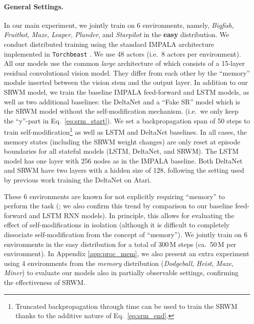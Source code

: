 \documentclass[nohyperref]{article}
\theoremstyle{plain}
\theoremstyle{definition}
\theoremstyle{remark}
\begin{document}
\paragraph{General Settings.}
In our main experiment, we jointly train on 6 environments, namely, \textit{Bigfish}, \textit{Fruitbot}, \textit{Maze}, \textit{Leaper}, \textit{Plunder}, and \textit{Starpilot}
in the \textbf{easy} distribution.
We conduct distributed training using the standard IMPALA \citep{EspeholtSMSMWDF18} architecture implemented in \texttt{Torchbeast} \citep{kuttler2019torchbeast}.
We use 48 actors (i.e.~8 actors per environment).
All our models use the common \textit{large} architecture of \citet{EspeholtSMSMWDF18} which consists of a 15-layer residual convolutional vision model.
They differ from each other by 
the ``memory'' module inserted between the vision stem and the output layer.
In addition to our SRWM model, we train the baseline IMPALA feed-forward and LSTM \citep{gers2000learning, hochreiter1997long} models,
as well as two additional baselines: the DeltaNet \citep{schlag2021linear} and a ``Fake SR'' model which is the SRWM model
without the self-modification mechanism.
(i.e.~we only keep the ``y''-part in Eq.~\ref{eq:srm_start}).
We set a backpropagation span of 50 steps to train self-modification\footnote{Truncated backpropagation through time \citep{williams1990efficient} can be used to train the SRWM thanks to the additive nature of Eq.~\ref{eq:srm_end}.} as well as LSTM and DeltaNet baselines.
In all cases, the memory states (including the SRWM weight changes) are only reset at episode boundaries for all stateful models (LSTM, DeltaNet, and SRWM).
The LSTM model has one layer with 256 nodes as in the IMPALA baseline.
Both DeltaNet and SRWM have two layers with a hidden size of 128,
following the setting used by previous work \citep{irie2021going} training the DeltaNet on Atari.

These 6 environments are known for not explicitly requiring ``memory'' to perform the task (\citet{CobbeHHS20}; we also confirm this trend by comparison to our baseline feed-forward and LSTM RNN models).
In principle, this allows for evaluating the effect of self-modifications in isolation (although it is difficult to completely dissociate self-modification from the concept of ``memory'').
We jointly train on 6 environments in the easy distribution for a total of 300\,M steps (ca.~50\,M per environment).
In Appendix \ref{app:proc_mem}, we also present an extra experiment using 4 environments from the \textit{memory} distribution (\textit{Dodgeball}, \textit{Heist}, \textit{Maze}, \textit{Miner}) to evaluate our models also in partially observable settings, confirming the effectiveness of SRWM.
\end{document}
